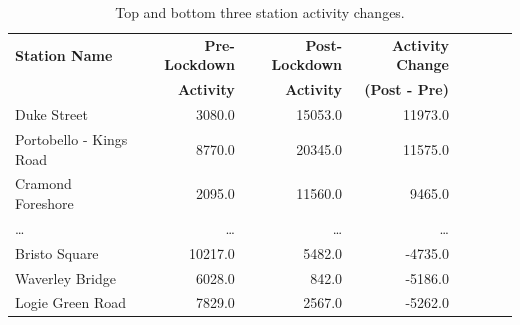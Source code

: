 \documentclass[11pt,a4paper]{article}
\begin{document}
\begin{table}[ht]
    \centering
    \begin{tabular}{lrrrrrrr}
\hline\hline
            \textbf{Station Name} &  \textbf{Pre-Lockdown} &  \textbf{Post-Lockdown} &  \textbf{Activity Change} \\ & \textbf{Activity} & \textbf{Activity} & \textbf{(Post - Pre)} \\
\hline
             Duke Street &                 3080.0 &                 15053.0 &                          11973.0 \\
 Portobello - Kings Road &                 8770.0 &                 20345.0 &                          11575.0 \\
       Cramond Foreshore &                 2095.0 &                 11560.0 &                           9465.0 \\
       \dots&\dots&\dots&\dots \\ 
       
    Bristo Square &                10217.0 &                  5482.0 &                          -4735.0 \\
  Waverley Bridge &                 6028.0 &                   842.0 &                          -5186.0 \\
 Logie Green Road &                 7829.0 &                  2567.0 &                          -5262.0 \\
       
\hline

\end{tabular}

    \caption{Top and bottom three station activity changes.}
\end{table}
\end{document}
